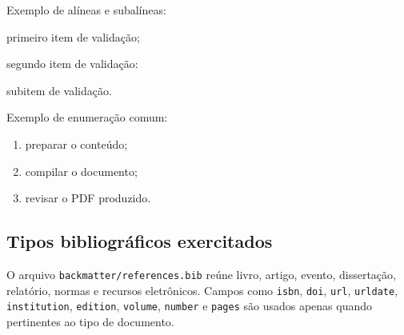 Exemplo de alíneas e subalíneas:

\begin{ufclettereditems}
  \item primeiro item de validação;
  \item segundo item de validação:
    \begin{ufcdashedsubitems}
      \item subitem de validação.
    \end{ufcdashedsubitems}
\end{ufclettereditems}

Exemplo de enumeração comum:

\begin{enumerate}
  \item preparar o conteúdo;
  \item compilar o documento;
  \item revisar o PDF produzido.
\end{enumerate}

\subsection{Tipos bibliográficos exercitados}

O arquivo \texttt{backmatter/references.bib} reúne livro, artigo, evento, dissertação, relatório, normas e recursos eletrônicos. Campos como \texttt{isbn}, \texttt{doi}, \texttt{url}, \texttt{urldate}, \texttt{institution}, \texttt{edition}, \texttt{volume}, \texttt{number} e \texttt{pages} são usados apenas quando pertinentes ao tipo de documento.

\nocite{lamport1994,wessberg2000,vaswani2017attention,almeida2018,rfc9110}

